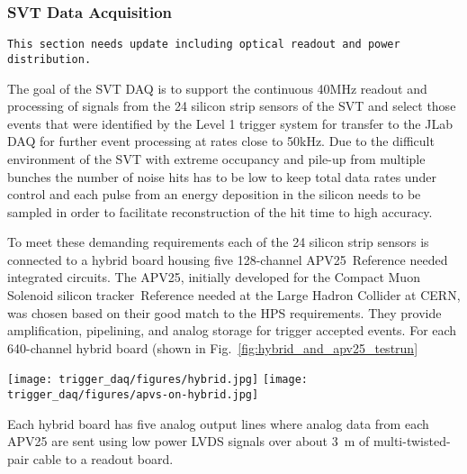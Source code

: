 \subsubsection{SVT Data Acquisition}
\label{sec:svt_daq}

\begin{verbatim}
This section needs update including optical readout and power distribution.
\end{verbatim}


The goal of the SVT DAQ is to support the continuous 40MHz readout and processing of signals from 
the 24 silicon strip sensors of the SVT and select those events that were identified by the 
Level 1 trigger system for transfer to the JLab DAQ for further event processing at rates 
close to 50kHz. 
Due to the difficult environment of the SVT with extreme occupancy and pile-up from multiple bunches  the number of noise hits has to be low to keep total data rates under control and 
each pulse from an energy deposition in the silicon needs to be sampled in order to facilitate 
reconstruction of the hit time to high accuracy. 

To meet these demanding requirements each of the 24 silicon strip sensors is connected to a 
hybrid board housing five 128-channel APV25~{\color{red}Reference needed} integrated circuits. The APV25, initially developed for the Compact Muon Solenoid silicon
 tracker~{\color{red}Reference needed}  at the Large Hadron Collider at CERN, was 
 chosen based on their good match to the HPS requirements. They provide amplification, 
 pipelining, and analog storage for trigger accepted events. For each 640-channel hybrid 
 board (shown in Fig.~\ref{fig:hybrid_and_apv25_testrun}
 \begin{figure*}[t]
\texttt{[image: trigger\_daq/figures/hybrid.jpg]}
\texttt{[image: trigger\_daq/figures/apvs-on-hybrid.jpg]}
\caption{\small{Picture of a hybrid board from the test run in 2012 holding five 
APV25 ASICs that are wire bonded to the silicon sensor.}}
\label{fig:hybrid_and_apv25_testrun}
\end{figure*}
Each hybrid board has five analog output lines where analog data from each APV25 are 
sent using low power LVDS signals over about 3~m of multi-twisted-pair cable to a readout 
board. 

